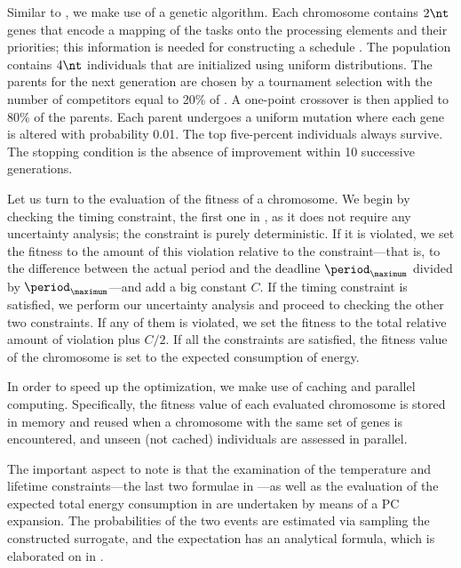 Similar to , we make use of a genetic algorithm. Each
chromosome contains $2 \nt$ genes that encode a mapping of the tasks onto the
processing elements and their priorities; this information is needed for
constructing a schedule \schedule. The population contains $4 \nt$ individuals
that are initialized using uniform distributions. The parents for the next
generation are chosen by a tournament selection with the number of competitors
equal to 20\% of \nt. A one-point crossover is then applied to 80\% of the
parents. Each parent undergoes a uniform mutation where each gene is altered
with probability 0.01. The top five-percent individuals always survive. The
stopping condition is the absence of improvement within 10 successive
generations.

Let us turn to the evaluation of the fitness of a chromosome. We begin by
checking the timing constraint, the first one in
, as it does not require any uncertainty
analysis; the constraint is purely deterministic. If it is violated, we set the
fitness to the amount of this violation relative to the constraint---that is, to
the difference between the actual period and the deadline $\period_\maximum$
divided by $\period_\maximum$---and add a big constant $C$. If the timing
constraint is satisfied, we perform our uncertainty analysis and proceed to
checking the other two constraints. If any of them is violated, we set the
fitness to the total relative amount of violation plus $C / 2$. If all the
constraints are satisfied, the fitness value of the chromosome is set to the
expected consumption of energy.

In order to speed up the optimization, we make use of caching and parallel
computing. Specifically, the fitness value of each evaluated chromosome is
stored in memory and reused when a chromosome with the same set of genes is
encountered, and unseen (not cached) individuals are assessed in parallel.

The important aspect to note is that the examination of the temperature and
lifetime constraints---the last two formulae in
---as well as the evaluation of the
expected total energy consumption in  are
undertaken by means of a \ac{PC} expansion. The probabilities of the two events
are estimated via sampling the constructed surrogate, and the expectation has an
analytical formula, which is elaborated on in .

